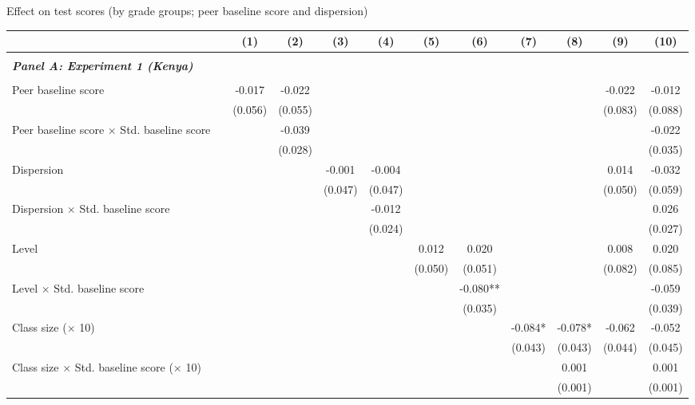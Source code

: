 \begin{center} 
\caption{\small Effect on test scores (by grade groups; peer baseline score and dispersion)} 
\label{tab:descriptives} 
\begin{scriptsize}
\begin{threeparttable}
\begin{tabular} {@{} l l c c c c c c c c c c  @{}} \toprule \toprule
& &(1)&(2)&(3)&(4)&(5)&(6)&(7)&(8)&(9)&(10) \\ \midrule 
\\
\multicolumn{3}{l}{\textbf{\textit{Panel A: Experiment 1 (Kenya)}}} \\
\\
Peer baseline score &  & -0.017 & -0.022 &  &  &  &  &  &  & -0.022 & -0.012 \\
                 &  & (0.056) & (0.055) &  &  &  &  &  &  & (0.083) & (0.088) \\
Peer baseline score $\times$ Std. baseline score &  &  & -0.039 &  &  &  &  &  &  &  & -0.022 \\
                 &  &  & (0.028) &  &  &  &  &  &  &  & (0.035) \\
Dispersion &  &  &  & -0.001 & -0.004 &  &  &  &  & 0.014 & -0.032 \\
                 &  &  &  & (0.047) & (0.047) &  &  &  &  & (0.050) & (0.059) \\
Dispersion $\times$ Std. baseline score &  &  &  &  & -0.012 &  &  &  &  &  & 0.026 \\
                 &  &  &  &  & (0.024) &  &  &  &  &  & (0.027) \\
Level &  &  &  &  &  & 0.012 & 0.020 &  &  & 0.008 & 0.020 \\
                 &  &  &  &  &  & (0.050) & (0.051) &  &  & (0.082) & (0.085) \\
Level $\times$ Std. baseline score &  &  &  &  &  &  & -0.080** &  &  &  & -0.059 \\
                 &  &  &  &  &  &  & (0.035) &  &  &  & (0.039) \\
Class size ($\times$ 10) &  &  &  &  &  &  &  & -0.084* & -0.078* & -0.062 & -0.052 \\
                 &  &  &  &  &  &  &  & (0.043) & (0.043) & (0.044) & (0.045) \\
Class size $\times$ Std. baseline score ($\times$ 10) &  &  &  &  &  &  &  &  & 0.001 &  & 0.001 \\
                 &  &  &  &  &  &  &  &  & (0.001) &  & (0.001) \\

\end{tabular}
\end{threeparttable}
\end{scriptsize}
\end{center}
